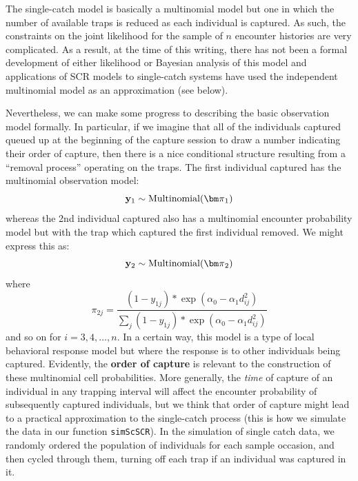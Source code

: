 The single-catch model is basically a multinomial model but one in
which the number of available traps is reduced as each individual is
captured. As such, the constraints on the joint likelihood for the
sample of $n$ encounter histories are very complicated.  As a result,
at the time of this writing, there has not been a formal development
of either likelihood or Bayesian analysis of this model and
applications of SCR models to single-catch systems have used the
independent multinomial model as an approximation (see below).

Nevertheless, we can make some progress to describing the basic
observation model formally. In particular, if we imagine that all of
the individuals captured queued up at the beginning of the capture
session to draw a number indicating their order of capture, then there
is a nice conditional structure resulting from a ``removal process''
operating on the traps.  The first individual captured has the
multinomial observation model:
\[
{\bf y}_{1} \sim \mbox{Multinomial}({\bm \pi}_{1})
\]
whereas the 2nd individual captured also has a multinomial encounter
probability model but with the trap which captured the first
individual removed. We might express this as:
\[
{\bf y}_{2} \sim \mbox{Multinomial}({\bm \pi}_{2})
\]
where
\[
 \pi_{2j}  = \frac{ (1-y_{1j}) * \exp( \alpha_{0} - \alpha_{1}   d_{ij}^{2}) }
{ \sum_{j} (1-y_{1j}) * \exp( \alpha_{0} - \alpha_{1}   d_{ij}^{2}) }
\]
and so on for $i=3,4,\ldots,n$.  In a certain way, this model is a
type of local behavioral response model but where the response is to
other individuals being captured.  Evidently, the {\bf order of
  capture} is relevant to the construction of these multinomial cell
probabilities. More generally, the {\it time} of capture of an
individual in any trapping interval will affect the encounter
probability of subsequently captured individuals, but we think
that %
order of capture might lead to a practical approximation to the
single-catch process (this is how we simulate the data in our function
\mbox{\tt simScSCR}).
In the
simulation of single catch data, we randomly ordered the population of
individuals for each sample occasion,
and then cycled through them, turning off each trap if an individual
was captured in it.


